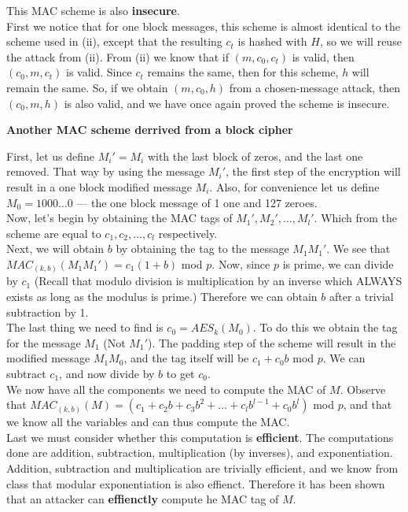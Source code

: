 \documentclass[12pt]{article}
\begin{document}
\begin{list}{.}{}
\begin{list}{)}{}
\item This MAC scheme is also \textbf{insecure}.\\
First we notice that for one block messages, this scheme is almost identical to
the scheme used in (ii), except that the resulting $c_t$ is hashed with $H$, so
we will reuse the attack from (ii).  From (ii) we know that if $(m, c_0, c_t)$
is valid, then $(c_0, m, c_t)$ is valid.  Since $c_t$ remains the same, then for
this scheme, $h$ will remain the same.  So, if we obtain $(m, c_0, h)$ from a
chosen-message attack, then $(c_0, m, h)$ is also valid, and we have once again
proved the scheme is insecure.
\end{list}

\item \textbf{Another MAC scheme derrived from a block cipher}

First, let us define $M_i' = M_i$ with the last block of zeros, and the
last one removed.  That way by using the message $M_i'$, the first step of the
encryption will result in a one block modified message $M_i$.  Also, for
convenience let us define $M_0 = 1000\dots 0$ --- the one block message of 1 one
and 127 zeroes.\\
Now, let's begin by obtaining the MAC tags of $M_1', M_2', \dots, M_l'$.  Which
from the scheme are equal to $c_1, c_2, \dots, c_l$ respectively.\\
Next, we will obtain $b$ by obtaining the tag to the message $M_1M_1'$.  We see
that $MAC_{(k,b)}(M_1M_1') = c_1(1 + b)$ mod $p$.  Now, since $p$ is prime, we
can divide by $c_1$ (Recall that modulo division is multiplication by an inverse
which ALWAYS exists as long as the modulus is prime.)  Therefore we can obtain
$b$ after a trivial subtraction by 1.\\
The last thing we need to find is $c_0 = AES_k(M_0)$.  To do this we obtain the
tag for the message $M_1$ (Not $M_1'$).  The padding step of the scheme will
result in the modified message $M_1M_0$, and the tag itself will be $c_1 + c_0b$
mod $p$.  We can subtract $c_1$, and now divide by $b$ to get $c_0$.\\
We now have all the components we need to compute the MAC of $M$.  Observe that
$MAC_{(k,b)}(M) = (c_1 + c_2b + c_3b^2 + \dots + c_lb^{l-1} + c_0b^l)$ mod $p$,
and that we know all the variables and can thus compute the MAC.\\
Last we must consider whether this computation is \textbf{efficient}.  The
computations done are addition, subtraction, multiplication (by inverses), and
exponentiation.  Addition, subtraction and multiplication are trivially
efficient, and we know from class that modular exponentiation is also effienct.
Therefore it has been shown that an attacker can \textbf{effienctly} compute he
MAC tag of $M$.


\end{list}
\end{document}
